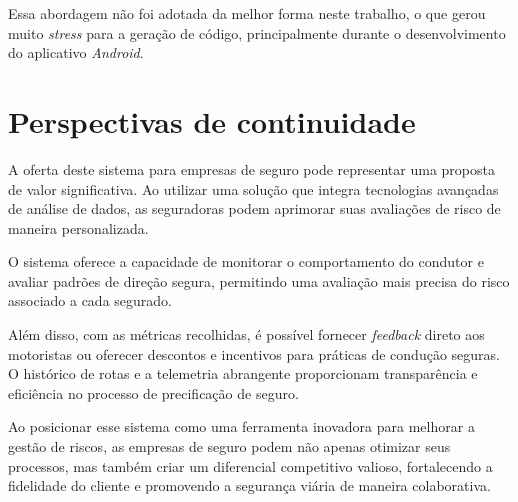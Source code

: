     Essa abordagem não foi adotada da melhor forma neste trabalho, o que gerou muito \textit{stress} para a geração de código, principalmente durante o desenvolvimento do aplicativo \textit{Android}.

\section{Perspectivas de continuidade}
A oferta deste sistema para empresas de seguro pode representar uma proposta de valor significativa. Ao utilizar uma solução que integra tecnologias avançadas de análise de dados, as seguradoras podem aprimorar suas avaliações de risco de maneira personalizada. 

O sistema oferece a capacidade de monitorar o comportamento do condutor e avaliar padrões de direção segura, permitindo uma avaliação mais precisa do risco associado a cada segurado. 

Além disso, com as métricas recolhidas, é possível fornecer \textit{feedback} direto aos motoristas ou oferecer descontos e incentivos para práticas de condução seguras. O histórico de rotas e a telemetria abrangente proporcionam transparência e eficiência no processo de precificação de seguro. 

Ao posicionar esse sistema como uma ferramenta inovadora para melhorar a gestão de riscos, as empresas de seguro podem não apenas otimizar seus processos, mas também criar um diferencial competitivo valioso, fortalecendo a fidelidade do cliente e promovendo a segurança viária de maneira colaborativa.